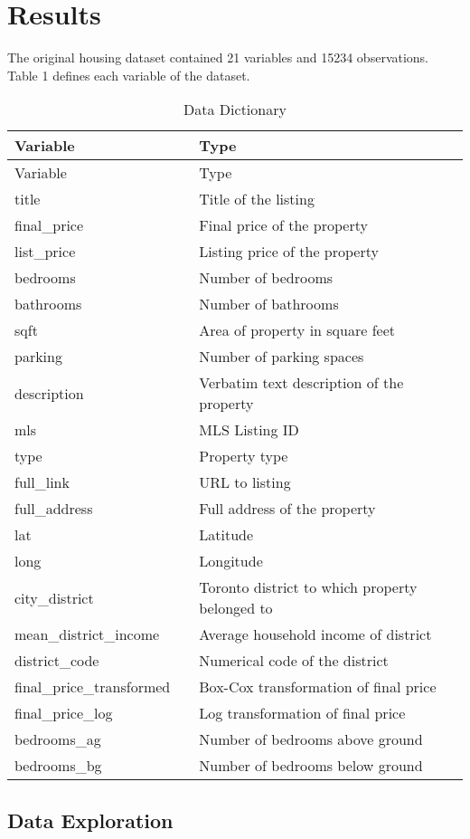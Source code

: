 \documentclass[11pt,]{article}
\begin{document}
\hypertarget{results}{%
\section{Results}\label{results}}

The original housing dataset contained 21 variables and 15234
observations. Table 1 defines each variable of the dataset.

\begin{longtable}[]{@{}lll@{}}
\caption{Data Dictionary}\tabularnewline
\toprule
Variable & & Type\tabularnewline
\midrule
\endfirsthead
\toprule
Variable & & Type\tabularnewline
\midrule
\endhead
title & & Title of the listing\tabularnewline
final\_price & & Final price of the property\tabularnewline
list\_price & & Listing price of the property\tabularnewline
bedrooms & & Number of bedrooms\tabularnewline
bathrooms & & Number of bathrooms\tabularnewline
sqft & & Area of property in square feet\tabularnewline
parking & & Number of parking spaces\tabularnewline
description & & Verbatim text description of the property\tabularnewline
mls & & MLS Listing ID\tabularnewline
type & & Property type\tabularnewline
full\_link & & URL to listing\tabularnewline
full\_address & & Full address of the property\tabularnewline
lat & & Latitude\tabularnewline
long & & Longitude\tabularnewline
city\_district & & Toronto district to which property belonged
to\tabularnewline
mean\_district\_income & & Average household income of
district\tabularnewline
district\_code & & Numerical code of the district\tabularnewline
final\_price\_transformed & & Box-Cox transformation of final
price\tabularnewline
final\_price\_log & & Log transformation of final price\tabularnewline
bedrooms\_ag & & Number of bedrooms above ground\tabularnewline
bedrooms\_bg & & Number of bedrooms below ground\tabularnewline
\bottomrule
\end{longtable}

\hypertarget{data-exploration}{%
\subsection{Data Exploration}\label{data-exploration}}
\end{document}
